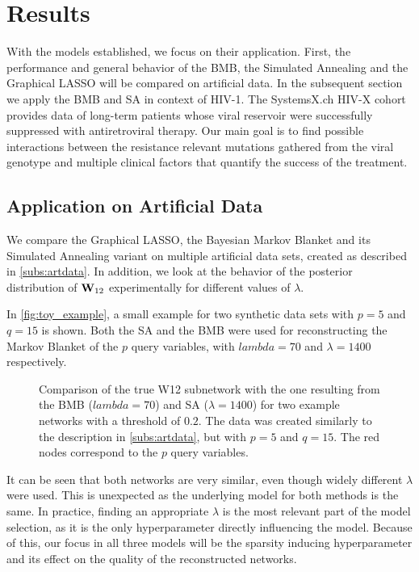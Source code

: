 \chapter{Results}
With the models established, we focus on their application.
First, the performance and general behavior of the \gls{BMB}, the Simulated Annealing and the Graphical LASSO will be compared on artificial data. 
In the subsequent section we apply the BMB and SA in context of HIV-1.
The SystemsX.ch HIV-X cohort \citep{HIVX} provides data of long-term patients whose viral reservoir were successfully suppressed with antiretroviral therapy.
Our main goal is to find possible interactions between the resistance relevant mutations gathered from the viral genotype and multiple clinical factors that quantify the success of the treatment.


\section{Application on Artificial Data}
We compare the Graphical LASSO, the Bayesian Markov Blanket and its Simulated Annealing variant on multiple artificial data sets, created as described in \autoref{subs:artdata}. 
In addition, we look at the behavior of the posterior distribution of $\mathbf{W}_{12}$ experimentally for different values of $\lambda$.

In \autoref{fig:toy_example}, a small example for two synthetic data sets with $p=5$ and $q=15$ is shown.
Both the SA and the BMB were used for reconstructing the Markov Blanket of the $p$ query variables, with $lambda=70$ and $\lambda=1400$ respectively.
\begin{figure}[H]
	\centering
	\caption{Comparison of the true W12 subnetwork with the one resulting from the BMB ($lambda=70$) and SA ($\lambda=1400$) for two example networks with a threshold of $0.2$. The data was created similarly to the description in \autoref{subs:artdata}, but with $p=5$ and $q=15$.
		The red nodes correspond to the $p$ query variables.}
	
	\label{fig:toy_example}
\end{figure}
It can be seen that both networks are very similar, even though widely different $\lambda$ were used.
This is unexpected as the underlying model for both methods is the same.
In practice, finding an appropriate $\lambda$ is the most relevant part of the model selection,
as it is the only hyperparameter directly influencing the model.
Because of this, our focus in all three models will be the sparsity inducing hyperparameter and its effect on the quality of the reconstructed networks.

